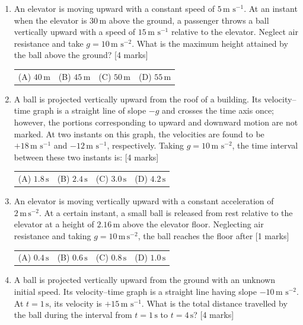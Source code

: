 \documentclass[11pt,a4paper]{article}
\begin{document}
\begin{enumerate}[resume]
\item An elevator is moving upward with a constant speed of \(5\,\text{m s}^{-1}\). At an instant when the elevator is \(30\,\text{m}\) above the ground, a passenger throws a ball vertically upward with a speed of \(15\,\text{m s}^{-1}\) relative to the elevator. Neglect air resistance and take \(g=10\,\text{m s}^{-2}\). What is the maximum height attained by the ball above the ground? \hfill [4 marks]
{\renewcommand{\arraystretch}{1.8}
\begin{tabularx}{\linewidth}{X X X X}
(A) \quad \(40\,\text{m}\) & (B) \quad \(45\,\text{m}\) & (C) \quad \(50\,\text{m}\) & (D) \quad \(55\,\text{m}\) \\[10pt]
\end{tabularx}}
\item A ball is projected vertically upward from the roof of a building. Its velocity--time graph is a straight line of slope $-g$ and crosses the time axis once; however, the portions corresponding to upward and downward motion are not marked. At two instants on this graph, the velocities are found to be $+18\,\text{m s}^{-1}$ and $-12\,\text{m s}^{-1}$, respectively. Taking $g=10\,\text{m s}^{-2}$, the time interval between these two instants is: \hfill [4 marks]
{\renewcommand{\arraystretch}{1.8}
\begin{tabularx}{\linewidth}{X X X X}
(A) \quad $1.8\,\text{s}$ & (B) \quad $2.4\,\text{s}$ & (C) \quad $3.0\,\text{s}$ & (D) \quad $4.2\,\text{s}$ \\[10pt]
\end{tabularx}}
\item An elevator is moving vertically upward with a constant acceleration of $2\,\mathrm{m\,s^{-2}}$. At a certain instant, a small ball is released from rest relative to the elevator at a height of $2.16\,\mathrm{m}$ above the elevator floor. Neglecting air resistance and taking $g=10\,\mathrm{m\,s^{-2}}$, the ball reaches the floor after \hfill [1 marks]
{\renewcommand{\arraystretch}{1.8}
\begin{tabularx}{\linewidth}{X X X X}
(A) \quad $0.4\,\mathrm{s}$ & (B) \quad $0.6\,\mathrm{s}$ & (C) \quad $0.8\,\mathrm{s}$ & (D) \quad $1.0\,\mathrm{s}$ \\[10pt]
\end{tabularx}}
\item A ball is projected vertically upward from the ground with an unknown initial speed. Its velocity–time graph is a straight line having slope $-10\,\text{m s}^{-2}$. At $t=1\,\text{s}$, its velocity is $+15\,\text{m s}^{-1}$. What is the total distance travelled by the ball during the interval from $t=1\,\text{s}$ to $t=4\,\text{s}$? \hfill [4 marks]

\end{enumerate}
\end{document}
